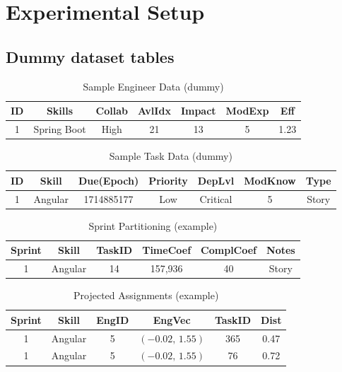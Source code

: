 \documentclass[final,1p,times]{elsarticle}
\begin{document}
\section{Experimental Setup}\label{sec:exp}

\subsection{Dummy dataset tables}
\begin{table}[H]
    \centering
    \caption{Sample Engineer Data (dummy)}
    \label{tab:engineers}
    \begin{tabular}{ccccccc}
    \toprule
    ID & Skills & Collab & AvlIdx & Impact & ModExp & Eff \\
    \midrule
    1 & Spring Boot & High & 21 & 13 & 5 & 1.23 \\
    \bottomrule
    \end{tabular}
\end{table}

\begin{table}[H]
    \centering
    \caption{Sample Task Data (dummy)}
    \label{tab:tasks}
    \begin{tabular}{ccccccc}
    \toprule
    ID & Skill & Due(Epoch) & Priority & DepLvl & ModKnow & Type \\
    \midrule
    1 & Angular & 1714885177 & Low & Critical & 5 & Story \\
    \bottomrule
    \end{tabular}
\end{table}

\begin{table}[H]
    \centering
    \caption{Sprint Partitioning (example)}
    \label{tab:sprints}
    \begin{tabular}{cccccc}
    \toprule
    Sprint & Skill & TaskID & TimeCoef & ComplCoef & Notes \\
    \midrule
    1 & Angular & 14 & 157{,}936 & 40 & Story \\
    \bottomrule
    \end{tabular}
\end{table}

\begin{table}[H]
    \centering
    \caption{Projected Assignments (example)}
    \label{tab:assignments}
    \begin{tabular}{cccccc}
    \toprule
    Sprint & Skill & EngID & EngVec & TaskID & Dist \\
    \midrule
    1 & Angular & 5 & $(-0.02,\,1.55)$ & 365 & 0.47 \\
    1 & Angular & 5 & $(-0.02,\,1.55)$ & 76  & 0.72 \\
    \bottomrule
    \end{tabular}
\end{table}
\end{document}
